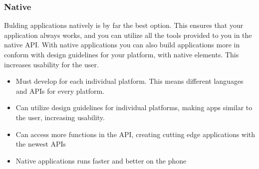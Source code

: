 \subsubsection{Native}
Bulding applications natively is by far the best option. This ensures that your application always works, and you can utilize all the tools provided to you in the native API. With native applications you can also build applications more in conform with design guidelines for your platform, with native elements. This increases usability for the user.
\cite{phonegap:about}
	\begin{itemize}
    \item Must develop for each individual platform. This means different languages and APIs for every platform.
    \item Can utilize design guidelines for individual platforms, making apps similar to the user, increasing usability.
    \item Can access more functions in the API, creating cutting edge applications with the newest APIs
    \item Native applications runs faster and better on the phone
	\end{itemize}
